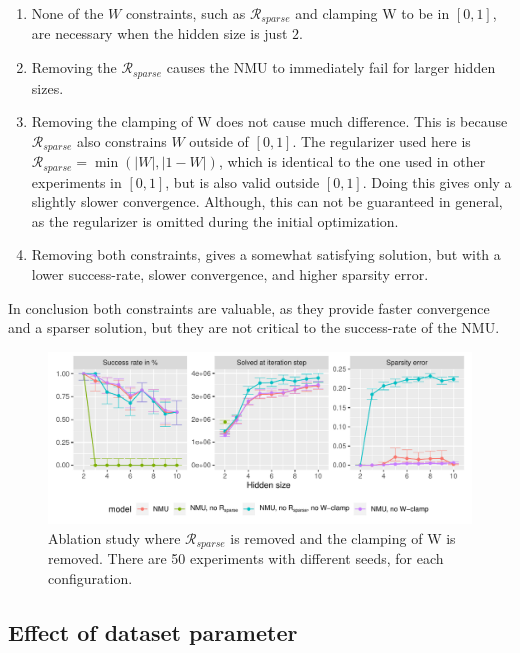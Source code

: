 \begin{enumerate}
    \item None of the $W$ constraints, such as $\mathcal{R}_{sparse}$ and clamping W to be in $[0, 1]$, are necessary when the hidden size is just $2$.
    \item Removing the $\mathcal{R}_{sparse}$ causes the NMU to immediately fail for larger hidden sizes.
    \item Removing the clamping of W does not cause much difference. This is because $\mathcal{R}_{sparse}$ also constrains $W$ outside of $[0, 1]$. The regularizer used here is $\mathcal{R}_{sparse} = \min(|W|, |1 - W|)$, which is identical to the one used in other experiments in $[0, 1]$, but is also valid outside $[0, 1]$. Doing this gives only a slightly slower convergence. Although, this can not be guaranteed in general, as the regularizer is omitted during the initial optimization.
    \item Removing both constraints, gives a somewhat satisfying solution, but with a lower success-rate, slower convergence, and higher sparsity error.
\end{enumerate}

In conclusion both constraints are valuable, as they provide faster convergence and a sparser solution, but they are not critical to the success-rate of the NMU.  

\begin{figure}[h]
\centering
\includegraphics[width=\linewidth]{results/simple_function_static_mul_hidden_size_ablation.pdf}
\caption{Ablation study where $\mathcal{R}_{sparse}$ is removed and the clamping of W is removed. There are 50 experiments with different seeds, for each configuration.}
\label{fig:simple-function-static-ablation}
\end{figure}

\subsection{Effect of dataset parameter}
\label{sec:appendix-simple-function-task:dataset-parameter-effect}

